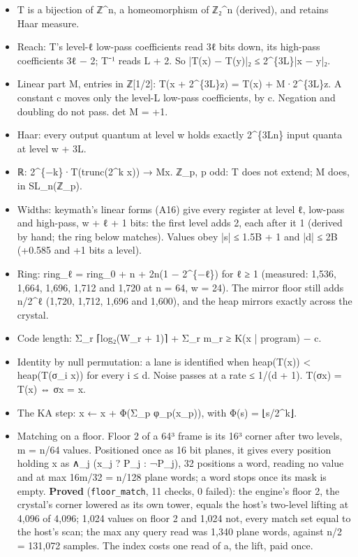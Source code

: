 \begin{itemize}
\begin{itemize}
\item T is a bijection of ℤ\textasciicircum{}n, a homeomorphism of ℤ₂\textasciicircum{}n (derived), and retains Haar measure.
\item Reach: T's level-ℓ low-pass coefficients read 3ℓ bits down, its high-pass coefficients 3ℓ − 2; T⁻¹ reads L + 2. So |T(x) − T(y)|₂ ≤ 2\textasciicircum{}\{3L\}|x − y|₂.
\item Linear part M, entries in ℤ[1/2]: T(x + 2\textasciicircum{}\{3L\}z) = T(x) + M·2\textasciicircum{}\{3L\}z. A constant c moves only the level-L low-pass coefficients, by c. Negation and doubling do not pass. det M = +1.
\item Haar: every output quantum at level w holds exactly 2\textasciicircum{}\{3Ln\} input quanta at level w + 3L.
\item ℝ: 2\textasciicircum{}\{−k\}·T(trunc(2\textasciicircum{}k x)) → Mx. ℤ\_\allowbreak{}p, p odd: T does not extend; M does, in SL\_\allowbreak{}n(ℤ\_\allowbreak{}p).
\item Widths: keymath's linear forms (A16) give every register at level ℓ, low-pass and high-pass, w + ℓ + 1 bits: the first level adds 2, each after it 1 (derived by hand; the ring below matches). Values obey |s| ≤ 1.5B + 1 and |d| ≤ 2B (+0.585 and +1 bits a level).
\item Ring: ring\_\allowbreak{}ℓ = ring\_\allowbreak{}0 + n + 2n(1 − 2\textasciicircum{}\{−ℓ\}) for ℓ ≥ 1 (measured: 1,536, 1,664, 1,696, 1,712 and 1,720 at n = 64, w = 24). The mirror floor still adds n/2\textasciicircum{}ℓ (1,720, 1,712, 1,696 and 1,600), and the heap mirrors exactly across the crystal.
\item Code length: Σ\_\allowbreak{}r ⌈log₂(W\_\allowbreak{}r + 1)⌉ + Σ\_\allowbreak{}r m\_\allowbreak{}r ≥ K(x | program) − c.
\item Identity by null permutation: a lane is identified when heap(T(x)) < heap(T(σ\_\allowbreak{}i x)) for every i ≤ d. Noise passes at a rate ≤ 1/(d + 1). T(σx) = T(x) ⇔ σx = x.
\item The KA step: x ← x + Φ(Σ\_\allowbreak{}p φ\_\allowbreak{}p(x\_\allowbreak{}p)), with Φ(s) = ⌊s/2\textasciicircum{}k⌋.
\item Matching on a floor. Floor 2 of a 64³ frame is its 16³ corner after two levels, m = n/64 values. Positioned once as 16 bit planes, it gives every position holding x as ∧\_\allowbreak{}j (x\_\allowbreak{}j ? P\_\allowbreak{}j : ¬P\_\allowbreak{}j), 32 positions a word, reading no value and at max 16m/32 = n/128 plane words; a word stops once its mask is empty. \textbf{Proved} (\texttt{floor\_\allowbreak{}match}, 11 checks, 0 failed): the engine's floor 2, the crystal's corner lowered as its own tower, equals the host's two-level lifting at 4,096 of 4,096; 1,024 values on floor 2 and 1,024 not, every match set equal to the host's scan; the max any query read was 1,340 plane words, against n/2 = 131,072 samples. The index costs one read of a, the lift, paid once.

\end{itemize}
\end{itemize}
